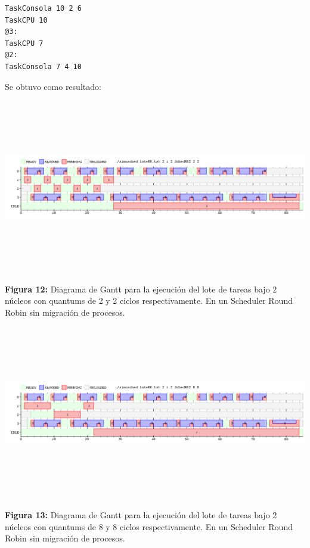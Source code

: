 \documentclass[a4paper]{article}
\begin{document}
 \begin{codesnippet}
	\begin{verbatim}
TaskConsola 10 2 6
TaskCPU 10
@3:
TaskCPU 7
@2:
TaskConsola 7 4 10
	\end{verbatim}
	\end{codesnippet}
	
Se obtuvo como resultado:	

\includegraphics[width=\textwidth,height=3.0in,keepaspectratio
]{imagenes/ej8/2eje1.png} \\
\begin {flushleft}
\textbf{Figura 12:} Diagrama de Gantt para la ejecuci\'on del lote de tareas bajo 2 n\'ucleos con quantums de 2 y 2 ciclos respectivamente. En un Scheduler Round Robin sin migración de procesos.
\end{flushleft}	
 
  
  \includegraphics[width=\textwidth,height=3.0in,keepaspectratio
]{imagenes/ej8/2eje2.png} \\
\begin {flushleft}
\textbf{Figura 13:} Diagrama de Gantt para la ejecuci\'on del lote de tareas bajo 2 n\'ucleos con quantums de 8 y 8 ciclos respectivamente. En un Scheduler Round Robin sin migración de procesos.
\end{flushleft}	
\end{document}
